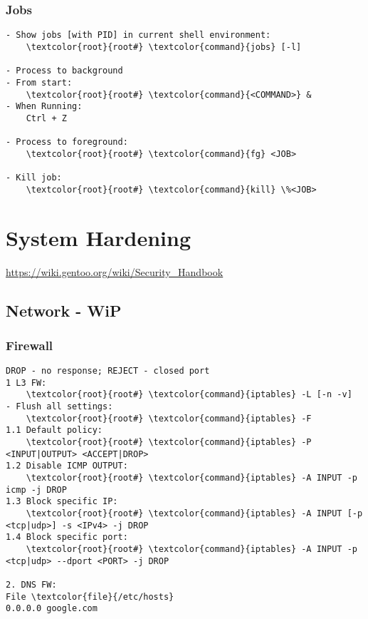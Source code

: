 \documentclass[10pt, a4paper, onecolumn, openany]{book}         %
\begin{document}
\subsection{Jobs}
\begin{Verbatim}[commandchars=\\\{\}]
- Show jobs [with PID] in current shell environment:
    \textcolor{root}{root#} \textcolor{command}{jobs} [-l]

- Process to background
- From start:
    \textcolor{root}{root#} \textcolor{command}{<COMMAND>} &
- When Running:
    Ctrl + Z

- Process to foreground:
    \textcolor{root}{root#} \textcolor{command}{fg} <JOB>

- Kill job:
    \textcolor{root}{root#} \textcolor{command}{kill} \%<JOB>
\end{Verbatim}



\chapter{System Hardening}%
\underline{\url{https://wiki.gentoo.org/wiki/Security_Handbook}}



\section{Network - WiP}
\subsection{Firewall}
\begin{Verbatim}[commandchars=\\\{\}]
DROP - no response; REJECT - closed port
1 L3 FW:
    \textcolor{root}{root#} \textcolor{command}{iptables} -L [-n -v]
- Flush all settings:
    \textcolor{root}{root#} \textcolor{command}{iptables} -F
1.1 Default policy:
    \textcolor{root}{root#} \textcolor{command}{iptables} -P <INPUT|OUTPUT> <ACCEPT|DROP>
1.2 Disable ICMP OUTPUT:
    \textcolor{root}{root#} \textcolor{command}{iptables} -A INPUT -p icmp -j DROP
1.3 Block specific IP:
    \textcolor{root}{root#} \textcolor{command}{iptables} -A INPUT [-p <tcp|udp>] -s <IPv4> -j DROP
1.4 Block specific port:
    \textcolor{root}{root#} \textcolor{command}{iptables} -A INPUT -p <tcp|udp> --dport <PORT> -j DROP

2. DNS FW:
File \textcolor{file}{/etc/hosts}
0.0.0.0 google.com
\end{Verbatim}
\end{document}
